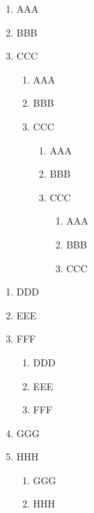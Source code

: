 ﻿\documentclass{article}
\begin{document}
    \begin{enumerate}[start=2]
        \item AAA
        \item BBB
        \item CCC
        \begin{enumerate}[start=2]
            \item AAA
            \item BBB
            \item CCC
            \begin{enumerate}[start=2]
                \item AAA
                \item BBB
                \item CCC
                \begin{enumerate}[start=2]
                    \item AAA
                    \item BBB
                    \item CCC
                \end{enumerate}
            \end{enumerate}
        \end{enumerate}
    \end{enumerate}

\dotfill

    \begin{enumerate}[resume] %
        \item DDD
        \item EEE
        \item FFF
        \begin{enumerate}[resume] %
            \item DDD
            \item EEE
            \item FFF
        \end{enumerate}
        \item GGG
        \item HHH
        \begin{enumerate}[resume] %
            \item GGG
            \item HHH
        \end{enumerate}
    \end{enumerate}
\end{document}
